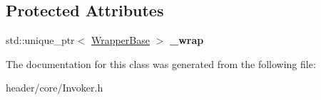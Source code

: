 \subsection*{Protected Attributes}
\begin{DoxyCompactItemize}
\item 
\mbox{\label{classcore_1_1_invoker_base_aac1eb2d0482d5c4897b8abb3aa93dc64}} 
std\+::unique\+\_\+ptr$<$ \hyperlink{structcore_1_1_invoker_base_1_1_wrapper_base}{Wrapper\+Base} $>$ {\bfseries \+\_\+wrap}
\end{DoxyCompactItemize}


The documentation for this class was generated from the following file\+:\begin{DoxyCompactItemize}
\item 
header/core/Invoker.\+h\end{DoxyCompactItemize}

